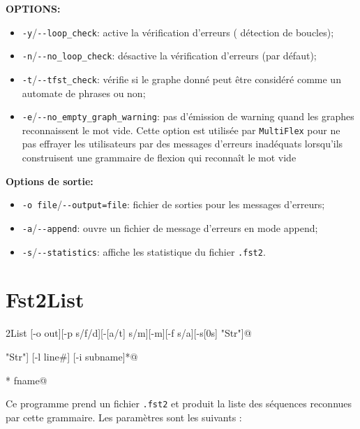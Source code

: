 \bigskip
\noindent \textbf{OPTIONS:}
\begin{itemize}
\item \verb+-y+/\verb+--loop_check+: active la vérification d'erreurs (
		détection de boucles);
\item \verb+-n+/\verb+--no_loop_check+: désactive la vérification d'erreurs (par défaut);
\item \verb+-t+/\verb+--tfst_check+: vérifie si le  graphe donné peut être considéré comme un
	automate de phrases ou non;
\item \verb+-e+/\verb+--no_empty_graph_warning+: pas d'émission de warning 
	quand les graphes reconnaissent le mot vide. Cette option est utilisée par \verb+MultiFlex+
	pour ne pas effrayer les utilisateurs par des messages d'erreurs inadéquats lorsqu'ils
	construisent une grammaire de flexion qui reconnaît le mot vide
\end{itemize}

\bigskip
\noindent \textbf{Options de sortie:}
\begin{itemize}
\item \verb+-o file+/\verb+--output=file+: fichier de sorties pour les messages d'erreurs;
\item \verb+-a+/\verb+--append+: ouvre un fichier de message d'erreurs en mode append;
\item \verb+-s+/\verb+--statistics+: affiche les statistique du fichier \verb+.fst2+.
\end{itemize}








\section{Fst2List}
\verb@Fst2List [-o out][-p s/f/d][-[a/t] s/m][-m][-f s/a][-s[0s] "Str"]@

\verb@         [-r[s/l] "Str"] [-l line#] [-i subname]*@

\verb@         [-c SS=0xxxx]* fname@

\bigskip
\noindent Ce programme prend un fichier  \verb+.fst2+ et produit la liste des séquences reconnues par cette grammaire. Les paramètres sont les suivants :


